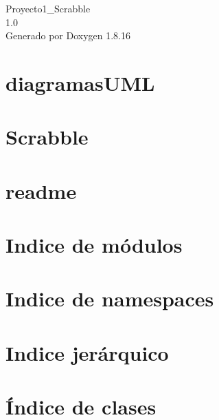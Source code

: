 \let\mypdfximage\pdfximage\def\pdfximage{\immediate\mypdfximage}\documentclass[twoside]{book}
\newcommand{\+}{\discretionary{\mbox{\scriptsize$\hookleftarrow$}}{}{}}
\newcommand{\clearemptydoublepage}{%
  \newpage{\pagestyle{empty}\cleardoublepage}%
}
\begin{document}
\hypersetup{pageanchor=false,
             bookmarksnumbered=true,
             pdfencoding=unicode
            }
\begin{titlepage}
\vspace*{7cm}
\begin{center}%
{\Large Proyecto1\+\_\+\+Scrabble \\[1ex]\large 1.\+0 }\\
\vspace*{1cm}
{\large Generado por Doxygen 1.8.16}\\
\end{center}
\end{titlepage}
\clearemptydoublepage
{}
\tableofcontents
\clearemptydoublepage
{}
\hypersetup{pageanchor=true}

\chapter{diagramas\+U\+ML}
\label{md__diagramas__u_m_l_diagramas_u_m_l}

\chapter{Scrabble}
\label{md__r_e_a_d_m_e}

\chapter{readme}
\label{md__tablas_de_historias_de_usuario_readme}

\chapter{Indice de módulos}

\chapter{Indice de namespaces}

\chapter{Indice jerárquico}

\chapter{Índice de clases}

\end{document}
